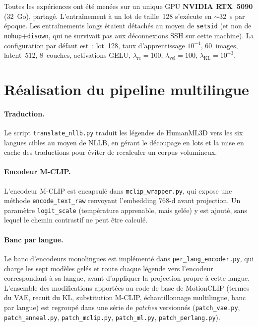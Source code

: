 \documentclass[12pt,a4paper,oneside]{report}
\theoremstyle{definition}
\theoremstyle{plain}
\newcommand{\lkl}{\ensuremath{\lambda_{\mathrm{KL}}}}
\newcommand{\lrc}{\ensuremath{\lambda_{\mathrm{rc}}}}
\newcommand{\lvel}{\ensuremath{\lambda_{\mathrm{vel}}}}
\begin{document}
Toutes les expériences ont été menées sur un unique GPU \textbf{NVIDIA RTX~5090}
(32~Go), partagé. L'entraînement à un lot de taille~128 s'exécute en
${\sim}32$~s par époque. Les entraînements longs étaient détachés au moyen de
\texttt{setsid} (et non de \texttt{nohup}+\texttt{disown}, qui ne survivait pas aux
déconnexions SSH sur cette machine). La configuration par défaut est~: lot~128,
taux d'apprentissage $10^{-4}$, 60~images, latent~512, 8~couches, activations
GELU, $\lrc=100$, $\lvel=100$, $\lkl=10^{-3}$.

\section{Réalisation du pipeline multilingue}
\label{sec:impl-pipeline}

\paragraph{Traduction.} Le script \texttt{translate\_nllb.py} traduit les
légendes de HumanML3D vers les six langues cibles au moyen de NLLB, en gérant le
découpage en lots et la mise en cache des traductions pour éviter de recalculer un
corpus volumineux.

\paragraph{Encodeur M-CLIP.} L'encodeur M-CLIP est encapsulé dans
\texttt{mclip\_wrapper.py}, qui expose une méthode \texttt{encode\_text\_raw}
renvoyant l'embedding $768$-d avant projection. Un paramètre \texttt{logit\_scale}
(température apprenable, mais gelée) y est ajouté, sans lequel le chemin
contrastif ne peut être calculé.

\paragraph{Banc par langue.} Le banc d'encodeurs monolingues est implémenté dans
\texttt{per\_lang\_encoder.py}, qui charge les sept modèles gelés et route chaque
légende vers l'encodeur correspondant à sa langue, avant d'appliquer la projection
propre à cette langue. L'ensemble des modifications apportées au code de base de
MotionCLIP (termes du VAE, recuit du KL, substitution M-CLIP, échantillonnage
multilingue, banc par langue) est regroupé dans une série de \emph{patches}
versionnés (\texttt{patch\_vae.py}, \texttt{patch\_anneal.py},
\texttt{patch\_mclip.py}, \texttt{patch\_ml.py}, \texttt{patch\_perlang.py}).
\end{document}
